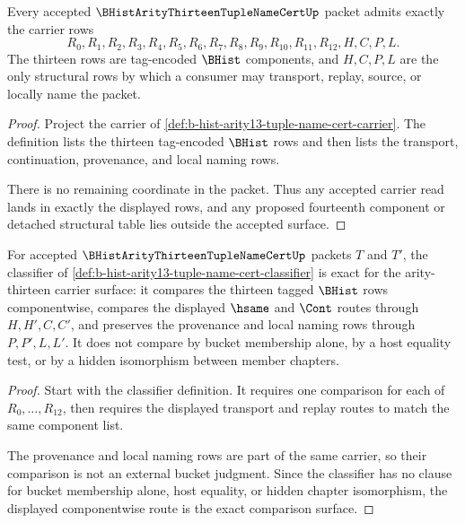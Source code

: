\begin{theorem}
\label{thm:b-hist-arity13-tuple-name-cert-carrier-admission}
Every accepted $\BHistArityThirteenTupleNameCertUp$ packet admits exactly the carrier rows
$$
R_0,R_1,R_2,R_3,R_4,R_5,R_6,R_7,R_8,R_9,R_{10},R_{11},R_{12},H,C,P,L.
$$
The thirteen rows are tag-encoded $\BHist$ components, and $H,C,P,L$ are the only structural rows by which a consumer may transport, replay, source, or locally name the packet.
\end{theorem}
\begin{proof}
Project the carrier of \autoref{def:b-hist-arity13-tuple-name-cert-carrier}. The definition lists the thirteen tag-encoded $\BHist$ rows and then lists the transport, continuation, provenance, and local naming rows.

There is no remaining coordinate in the packet. Thus any accepted carrier read lands in exactly the displayed rows, and any proposed fourteenth component or detached structural table lies outside the accepted surface.
\end{proof}

\begin{theorem}
\label{thm:b-hist-arity13-tuple-name-cert-classifier-exactness}
For accepted $\BHistArityThirteenTupleNameCertUp$ packets $T$ and $T'$, the classifier of \autoref{def:b-hist-arity13-tuple-name-cert-classifier} is exact for the arity-thirteen carrier surface: it compares the thirteen tagged $\BHist$ rows componentwise, compares the displayed $\hsame$ and $\Cont$ routes through $H,H',C,C'$, and preserves the provenance and local naming rows through $P,P',L,L'$. It does not compare by bucket membership alone, by a host equality test, or by a hidden isomorphism between member chapters.
\end{theorem}
\begin{proof}
Start with the classifier definition. It requires one comparison for each of $R_0,\ldots,R_{12}$, then requires the displayed transport and replay routes to match the same component list.

The provenance and local naming rows are part of the same carrier, so their comparison is not an external bucket judgment. Since the classifier has no clause for bucket membership alone, host equality, or hidden chapter isomorphism, the displayed componentwise route is the exact comparison surface.
\end{proof}

